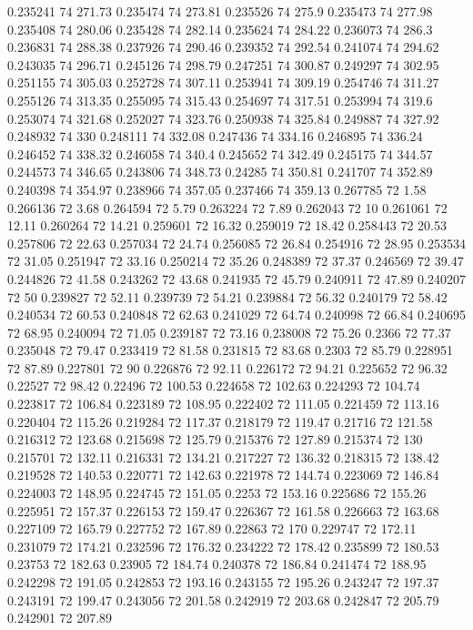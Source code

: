 0.235241 74 271.73
0.235474 74 273.81
0.235526 74 275.9
0.235473 74 277.98
0.235408 74 280.06
0.235428 74 282.14
0.235624 74 284.22
0.236073 74 286.3
0.236831 74 288.38
0.237926 74 290.46
0.239352 74 292.54
0.241074 74 294.62
0.243035 74 296.71
0.245126 74 298.79
0.247251 74 300.87
0.249297 74 302.95
0.251155 74 305.03
0.252728 74 307.11
0.253941 74 309.19
0.254746 74 311.27
0.255126 74 313.35
0.255095 74 315.43
0.254697 74 317.51
0.253994 74 319.6
0.253074 74 321.68
0.252027 74 323.76
0.250938 74 325.84
0.249887 74 327.92
0.248932 74 330
0.248111 74 332.08
0.247436 74 334.16
0.246895 74 336.24
0.246452 74 338.32
0.246058 74 340.4
0.245652 74 342.49
0.245175 74 344.57
0.244573 74 346.65
0.243806 74 348.73
0.24285 74 350.81
0.241707 74 352.89
0.240398 74 354.97
0.238966 74 357.05
0.237466 74 359.13
0.267785 72 1.58
0.266136 72 3.68
0.264594 72 5.79
0.263224 72 7.89
0.262043 72 10
0.261061 72 12.11
0.260264 72 14.21
0.259601 72 16.32
0.259019 72 18.42
0.258443 72 20.53
0.257806 72 22.63
0.257034 72 24.74
0.256085 72 26.84
0.254916 72 28.95
0.253534 72 31.05
0.251947 72 33.16
0.250214 72 35.26
0.248389 72 37.37
0.246569 72 39.47
0.244826 72 41.58
0.243262 72 43.68
0.241935 72 45.79
0.240911 72 47.89
0.240207 72 50
0.239827 72 52.11
0.239739 72 54.21
0.239884 72 56.32
0.240179 72 58.42
0.240534 72 60.53
0.240848 72 62.63
0.241029 72 64.74
0.240998 72 66.84
0.240695 72 68.95
0.240094 72 71.05
0.239187 72 73.16
0.238008 72 75.26
0.2366 72 77.37
0.235048 72 79.47
0.233419 72 81.58
0.231815 72 83.68
0.2303 72 85.79
0.228951 72 87.89
0.227801 72 90
0.226876 72 92.11
0.226172 72 94.21
0.225652 72 96.32
0.22527 72 98.42
0.22496 72 100.53
0.224658 72 102.63
0.224293 72 104.74
0.223817 72 106.84
0.223189 72 108.95
0.222402 72 111.05
0.221459 72 113.16
0.220404 72 115.26
0.219284 72 117.37
0.218179 72 119.47
0.21716 72 121.58
0.216312 72 123.68
0.215698 72 125.79
0.215376 72 127.89
0.215374 72 130
0.215701 72 132.11
0.216331 72 134.21
0.217227 72 136.32
0.218315 72 138.42
0.219528 72 140.53
0.220771 72 142.63
0.221978 72 144.74
0.223069 72 146.84
0.224003 72 148.95
0.224745 72 151.05
0.2253 72 153.16
0.225686 72 155.26
0.225951 72 157.37
0.226153 72 159.47
0.226367 72 161.58
0.226663 72 163.68
0.227109 72 165.79
0.227752 72 167.89
0.22863 72 170
0.229747 72 172.11
0.231079 72 174.21
0.232596 72 176.32
0.234222 72 178.42
0.235899 72 180.53
0.23753 72 182.63
0.23905 72 184.74
0.240378 72 186.84
0.241474 72 188.95
0.242298 72 191.05
0.242853 72 193.16
0.243155 72 195.26
0.243247 72 197.37
0.243191 72 199.47
0.243056 72 201.58
0.242919 72 203.68
0.242847 72 205.79
0.242901 72 207.89
